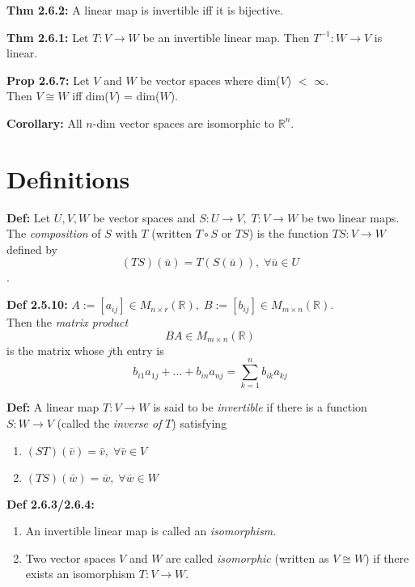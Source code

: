 \bigskip 

\noindent 
\textbf{Thm 2.6.2:} A linear map is invertible iff it is bijective. 

\bigskip 

\noindent 
\textbf{Thm 2.6.1:} Let $T: V \rightarrow W$ be an invertible linear map. Then $T^{-1}:W \rightarrow V$ is linear. 

\bigskip 

\noindent
\textbf{Prop 2.6.7:} Let $V$ and $W$ be vector spaces where dim($V$) $<$ $\infty$. \\ 
Then $V \cong W$ iff dim($V$) = dim($W$). 

\bigskip 

\noindent 
\textbf{Corollary:} All $n$-dim vector spaces are isomorphic to $\mathbb{R}^n$. 

\pagebreak

\section*{Definitions} 

\textbf{Def:} Let $U,V,W$ be vector spaces and $S: U \rightarrow V, \; T: V \rightarrow W$ be two linear maps. 
The \textit{composition} of $S$ with $T$ (written $T \circ S$ or $TS$) is the function $TS: V \rightarrow W$ defined by 
\[(TS)(\bar u) = T(S(\bar u)), \; \forall \bar u \in U\].

\noindent 
\textbf{Def 2.5.10:} $A := [a_{ij}] \in M_{n \times r}(\mathbb{R}), \; B := [b_{ij}] \in M_{m \times n}(\mathbb{R})$. \\
Then the \textit{matrix product} \\ 
\[BA \in M_{m \times n}(\mathbb{R})\]  
 is the matrix whose $j$th entry is 
\[b_{i1}a_{1j} + \ldots + b_{in}a_{nj} = \sum_{k = 1}^{n} b_{ik}a_{kj} \] 

\bigskip 

\noindent
\textbf{Def:} A linear map $T: V \rightarrow W$ is said to be \textit{invertible} if there is a function $S: W \rightarrow V$ (called the \textit{inverse of }$T$) satisfying 
\begin{enumerate}
    \item $(ST)(\bar v) = \bar v, \; \forall \bar v \in V$
    \item $(TS)(\bar w) = \bar w, \; \forall \bar w \in W$
\end{enumerate}

\bigskip 

\noindent 
\textbf{Def 2.6.3/2.6.4:} 
\begin{enumerate}
    \item An invertible linear map is called an \textit{isomorphism}. 
    \item Two vector spaces $V$ and $W$ are called \textit{isomorphic} (written as $V \cong W$) if there exists an isomorphism $T: V \rightarrow W$.
\end{enumerate}